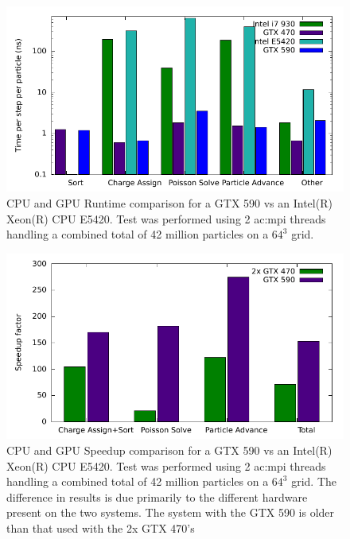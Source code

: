\noindent \begin{figure}
\begin{center}
\includegraphics[width=6in]{performance/architecture_compare.pdf}
\end{center}
\caption[CPU and GPU Runtime comparison]{CPU and GPU Runtime comparison for a GTX 590 vs an Intel(R) Xeon(R) CPU E5420. Test was performed using 2 \gls{ac:mpi} threads handling a combined total of 42 million particles on a $64^3$ grid.}
\label{fig:speedup} 
\end{figure} 

\noindent \begin{figure}
\begin{center}
\includegraphics[width=6in]{performance/architecture_speedup_compare.pdf}
\end{center}
\caption[CPU and GPU Speedup comparison]{CPU and GPU Speedup comparison for a GTX 590 vs an Intel(R) Xeon(R) CPU E5420. Test was performed using 2 \gls{ac:mpi} threads handling a combined total of 42 million particles on a $64^3$ grid. The difference in results is due primarily to the different hardware present on the two systems. The system with the GTX 590 is older than that used with the 2x GTX 470's}
\label{fig:speedup2} 
\end{figure} 



